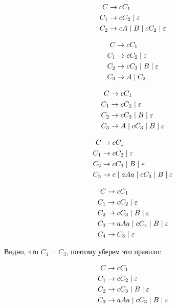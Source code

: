 \begin{align*}
C & \to c C_1\\
C_1 & \to c C_2  \;|\;  \varepsilon\\
C_2 & \to c A  \;|\;  B  \;|\;  c C_2  \;|\;  \varepsilon\\
\end{align*}

\begin{align*}
C & \to c C_1\\
C_1 & \to c C_2  \;|\;  \varepsilon\\
C_2 & \to c C_3  \;|\;  B  \;|\;  \varepsilon\\
C_3 & \to A  \;|\;  C_2\\
\end{align*}

\begin{align*}
C & \to c C_1\\
C_1 & \to c C_2  \;|\;  \varepsilon\\
C_2 & \to c C_3  \;|\;  B  \;|\;  \varepsilon\\
C_3 & \to A  \;|\;  c C_3  \;|\;  B  \;|\;  \varepsilon\\
\end{align*}

\begin{align*}
C & \to c C_1\\
C_1 & \to c C_2  \;|\;  \varepsilon\\
C_2 & \to c C_3  \;|\;  B  \;|\;  \varepsilon\\
C_3 & \to c  \;|\;  a A a  \;|\;  c C_3  \;|\;  B  \;|\;  \varepsilon\\
\end{align*}

\begin{align*}
C & \to c C_1\\
C_1 & \to c C_2  \;|\;  \varepsilon\\
C_2 & \to c C_3  \;|\;  B  \;|\;  \varepsilon\\
C_3 & \to a A a  \;|\;  c C_4  \;|\;  B  \;|\;  \varepsilon\\
C_4 & \to C_3  \;|\;  \varepsilon\\
\end{align*}

Видно, что $C_4 = C_3$, поэтому уберем это правило:

\begin{align*}
C & \to c C_1\\
C_1 & \to c C_2  \;|\;  \varepsilon\\
C_2 & \to c C_3  \;|\;  B  \;|\;  \varepsilon\\
C_3 & \to a A a  \;|\;  c C_3  \;|\;  B  \;|\;  \varepsilon\\
\end{align*}

